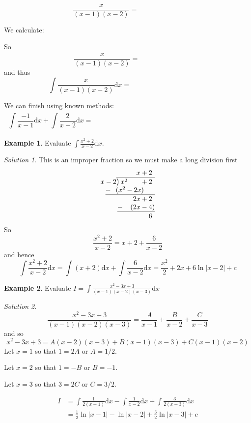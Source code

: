\documentclass[
  11pt,
  oneside]{book}
\newcommand{\slide}{}
\theoremstyle{definition}
\theoremstyle{definition}
\newtheorem{example}{Example}[chapter]
\theoremstyle{definition}
\theoremstyle{definition}
\theoremstyle{remark}
\newtheorem*{solution}{Solution}
\begin{document}
\begin{slidesonly}

\[
\frac{x}{(x-1)(x-2)} = \phantom{\frac A{x-1}+\frac B{x-2}.}
\]
\slide

We calculate:

\vfill

So
\[
\frac{x}{(x-1)(x-2)} = \phantom{\frac {-1}{x-1}+\frac 2{x-2}}
\]
and thus
\[
\int\frac{x}{(x-1)(x-2)}\mathrm{d}x = \phantom{\int\frac {-1}{x-1}\mathrm{d}x+\int\frac 2{x-2}\mathrm{d}x}
\]
\slide
We can finish using known methods:
\[
\int\frac {-1}{x-1}\mathrm{d}x+\int\frac 2{x-2}\mathrm{d}x = \phantom{-\ln|x-1|+2\ln|x-2|+c = \ln\left|\frac{(x-2)^2}{x-1}\right|+c.}
\]
\slide

\end{slidesonly}

\begin{example}
Evaluate \(\displaystyle\int\frac{x^2+2}{x-2}\mathrm{d}x\).
\end{example}

\begin{solution}
This is an improper fraction so we must make a long division first
\[
\begin{array}{r}
x+2\phantom{)}   \\
x-2{\overline{\smash{\big)}\,x^2\phantom{+2x}+2\phantom{)}}}\\
\underline{-~\phantom{(}(x^2-2x)\phantom{-b)}}\\
\phantom{0+}2x+2\phantom{)}\\ 
\underline{-~\phantom{()}(2x-4)}\\ 
\phantom{0+}6\phantom{)}
\end{array}
\]
So
\[
\frac{x^2+2}{x-2} = x+2+\frac6{x-2}
\]
and hence
\[
\int\frac{x^2+2}{x-2}\mathrm{d}x = \int (x+2)\mathrm{d}x+\int\frac6{x-2}\mathrm{d}x = \frac{x^2}{2}+2x+6\ln|x-2|+c
\]
\end{solution}

\slide

\begin{example}
Evaluate \(I = \displaystyle\int\frac{x^2-3x+3}{(x-1)(x-2)(x-3)} \mathrm{d}x\)
\end{example}

\begin{solution}
\[
\frac{x^2-3x+3}{(x-1)(x-2)(x-3)} = \frac A{x-1}+\frac B{x-2}+\frac C{x-3}
\]
and so
\[
x^2-3x+3 = A(x-2)(x-3) + B(x-1)(x-3) + C(x-1)(x-2)
\]
Let \(x=1\) so that \(1=2A\) or \(A=1/2\).

Let \(x=2\) so that \(1=-B\) or \(B=-1\).

Let \(x=3\) so that \(3=2C\) or \(C=3/2\).

\begin{align*}
I&= \int\frac 1{2(x-1)}\mathrm{d}x-\int\frac 1{x-2}\mathrm{d}x+\int\frac 3{2(x-3)}\mathrm{d}x\\
&=\frac 12\ln|x-1| -\ln|x-2| + \frac 32\ln|x-3|+c
\end{align*}
\end{solution}
\end{document}
